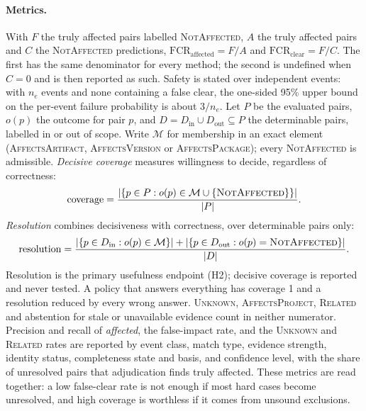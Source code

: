 \documentclass[11pt,a4paper]{article}
\begin{document}
\paragraph{Metrics.} With $F$ the truly affected pairs labelled
\textsc{NotAffected}, $A$ the truly affected pairs and $C$ the
\textsc{NotAffected} predictions, $\mathrm{FCR}_{\text{affected}} =
F/A$ and $\mathrm{FCR}_{\text{clear}} = F/C$. The first has the same
denominator for every method; the second is undefined when $C = 0$ and
is then reported as such. Safety is stated over independent events:
with $n_e$ events and none containing a false clear, the one-sided 95\%
upper bound on the per-event failure probability is about $3/n_e$.
Let $P$ be the evaluated pairs, $o(p)$ the outcome for pair $p$, and
$D = D_{\mathrm{in}} \cup D_{\mathrm{out}} \subseteq P$ the
determinable pairs, labelled in or out of scope. Write
$\mathcal{M}$ for membership in an exact element
(\textsc{AffectsArtifact}, \textsc{AffectsVersion} or
\textsc{AffectsPackage}); every \textsc{NotAffected} is admissible.
\emph{Decisive coverage} measures willingness to decide, regardless of
correctness:
\begin{equation}
  \mathrm{coverage} =
  \frac{|\{p \in P : o(p) \in \mathcal{M} \cup
        \{\text{\textsc{NotAffected}}\}\}|}{|P|}.
  \label{eq:coverage}
\end{equation}
\emph{Resolution} combines decisiveness with correctness, over
determinable pairs only:
\begin{equation}
  \mathrm{resolution} =
  \frac{|\{p \in D_{\mathrm{in}} : o(p) \in \mathcal{M}\}| +
        |\{p \in D_{\mathrm{out}} : o(p) =
        \text{\textsc{NotAffected}}\}|}{|D|}.
  \label{eq:resolution}
\end{equation}
Resolution is the primary usefulness endpoint (H2); decisive coverage
is reported and never tested. A policy that answers everything has
coverage 1 and a resolution reduced by every wrong answer.
\textsc{Unknown}, \textsc{AffectsProject}, \textsc{Related} and
abstention for stale or unavailable evidence count in neither
numerator. Precision and recall of \emph{affected}, the false-impact
rate, and the \textsc{Unknown} and \textsc{Related} rates are reported
by event class, match type, evidence strength, identity status,
completeness state and basis, and confidence level, with the share of
unresolved pairs that adjudication finds truly affected. These metrics
are read together: a low false-clear rate is not enough if most hard
cases become unresolved, and high coverage is worthless if it comes
from unsound exclusions.
\end{document}
